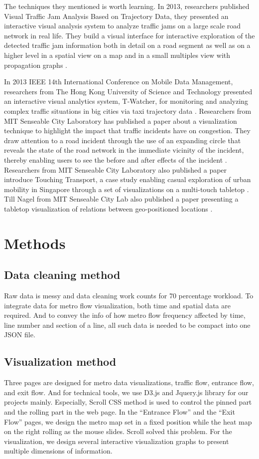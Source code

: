 \documentclass{proc}
\begin{document}
The techniques they mentioned is worth learning. In 2013, researchers published Visual Traffic Jam Analysis Based on Trajectory Data, they presented an interactive visual analysis system to analyze traffic jams on a large scale road network in real life. They build a visual interface for interactive exploration of the detected traffic jam information both in detail on a road segment as well as on a higher level in a spatial view on a map and in a small multiples view with propagation graphs \cite{4}. 

In 2013 IEEE 14th International Conference on Mobile Data Management, researchers from The Hong Kong University of Science and Technology presented an interactive visual analytics system, T-Watcher, for monitoring and analyzing complex traffic situations in big cities via taxi trajectory data \cite{5}. Researchers from MIT Senseable City Laboratory has published a paper about a visualization technique to highlight the impact that traffic incidents have on congestion. They draw attention to a road incident through the use of an expanding circle that reveals the state of the road network in the immediate vicinity of the incident, thereby enabling users to see the before and after effects of the incident \cite{6}. Researchers from MIT Senseable City Laboratory also published a paper introduce Touching Transport, a case study enabling casual exploration of urban mobility in Singapore through a set of visualizations on a multi-touch tabletop \cite{7}. Till Nagel from MIT Senseable City Lab also published a paper presenting a tabletop visualization of relations between geo-positioned locations \cite{8}.  

\section{Methods}
\subsection{Data cleaning method}
Raw data is messy and data cleaning work counts for 70 percentage workload. To integrate data for metro flow visualization, both time and spatial data are required. And to convey the info of how metro flow frequency affected by time, line number and section of a line, all such data is needed to be compact into one JSON file.

\subsection{Visualization method}
Three pages are designed for metro data visualizations, traffic flow, entrance flow, and exit flow. And for technical tools, we use D3.js and Jquery.js library for our projects mainly. Especially, Scroll CSS method is used to control the pinned part and the rolling part in the web page. In the “Entrance Flow” and the “Exit Flow” pages, we design the metro map set in a fixed position while the heat map on the right rolling as the mouse slides. Scroll solved this problem. For the visualization, we design several interactive visualization graphs to present multiple dimensions of information.
\end{document}
